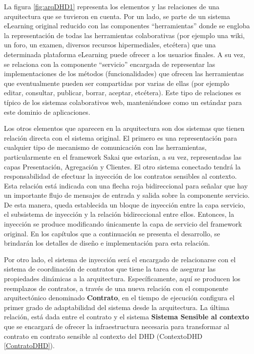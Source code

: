 La figura \ref{fig:arqDHD1} representa los elementos y las relaciones de una arquitectura que se tuvieron en cuenta. Por un lado, se parte de un sistema eLearning original reducido con las componentes “herramientas” donde se engloba la representación de todas las herramientas colaborativas (por ejemplo  una wiki, un foro, un examen, diversos recursos hipermediales, etcétera) que una determinada plataforma eLearning puede ofrecer a los usuarios finales. A su vez, se relaciona con la componente “servicio” encargada de representar las implementaciones de los métodos (funcionalidades) que ofrecen las herramientas que eventualmente pueden ser compartidas por varias de ellas (por ejemplo editar, consultar, publicar, borrar, aceptar, etcétera). Este tipo de relaciones es típico de los sistemas colaborativos web, manteniéndose como un estándar para este dominio de aplicaciones. 

Los otros elementos que aparecen en la arquitectura son dos sistemas que tienen relación directa con el sistema original. El primero es una representación para cualquier tipo de mecanismo de comunicación con las herramientas, particularmente en el framework Sakai \cite{sakaimanual} que estarían, a su vez, representadas las capas Presentación, Agregación y Clientes. El otro sistema conectado tendrá la responsabilidad de efectuar la inyección de los contratos sensibles al contexto. Esta relación está indicada con una flecha roja bidireccional para señalar que hay un importante flujo de mensajes de entrada y salida sobre la componente servicio. De esta manera, queda establecida un bloque de inyección entre la capa servicio, el subsistema de inyección y la relación bidireccional entre ellos. Entonces, la inyección se produce modificando únicamente la capa de servicio del framework original. En los capítulos que a continuación se presenta el desarrollo, se brindarán los detalles de diseño e implementación para esta relación.

Por otro lado, el sistema de inyección será el encargado de relacionarse con el sistema de coordinación de contratos que tiene la tarea de asegurar las propiedades dinámicas a la arquitectura. Específicamente, aquí se producen los reemplazos de contratos, a través de una nueva relación con el componente arquitectónico denominado \textbf{Contrato}, en el tiempo de ejecución configura el primer grado de adaptabilidad del sistema desde la arquitectura. La última relación, está dada entre el contrato y el sistema \textbf{Sistema Sensible al contexto} que se encargará de ofrecer la infraestructura necesaria para transformar al contrato en contrato sensible al contexto del DHD (ContextoDHD \ref{ContratoDHD}). 





